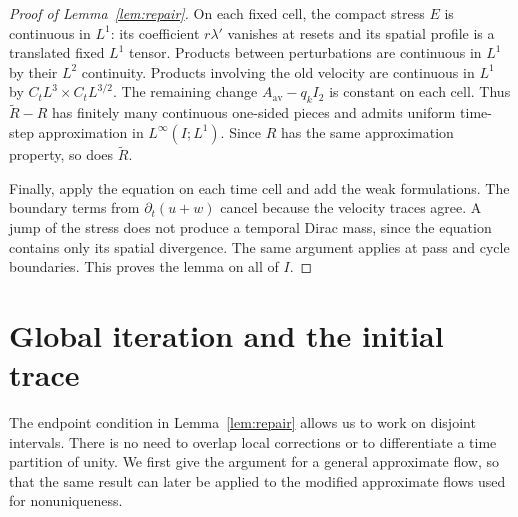 \documentclass[11pt,a4paper,reqno]{amsart}
\theoremstyle{plain}
\theoremstyle{definition}
\theoremstyle{remark}
\numberwithin{equation}{section}
\begin{document}
\begin{proof}[Proof of Lemma~\ref{lem:repair}]
On each fixed cell, the compact stress $E$ is continuous in
$L^1$: its coefficient $r\lambda'$ vanishes at resets and its spatial
profile is a translated fixed $L^1$ tensor. Products between perturbations are continuous in $L^1$ by their
$L^2$ continuity. Products involving the old velocity are continuous
in $L^1$ by $C_tL^3\times C_tL^{3/2}$. The remaining change
$A_{\mathrm{av}}-q_kI_2$ is constant on each cell. Thus
$\widetilde R-R$ has finitely many continuous one-sided pieces and
admits uniform time-step approximation in $L^\infty(I;L^1)$. Since
$R$ has the same approximation property, so does $\widetilde R$.

Finally, apply the equation on each time cell and add the weak
formulations. The boundary terms from $\partial_t(u+w)$ cancel
because the velocity traces agree. A jump of the stress does not
produce a temporal Dirac mass, since the equation contains only its
spatial divergence. The same argument applies at pass and cycle
boundaries. This proves the lemma on all of $I$.
\end{proof}

\section{Global iteration and the initial trace}\label{sec:global}

The endpoint condition in Lemma~\ref{lem:repair} allows us to work
on disjoint intervals. There is no need to overlap local corrections
or to differentiate a time partition of unity. We first give the
argument for a general approximate flow, so that the same result can
later be applied to the modified approximate flows used for
nonuniqueness.
\end{document}
